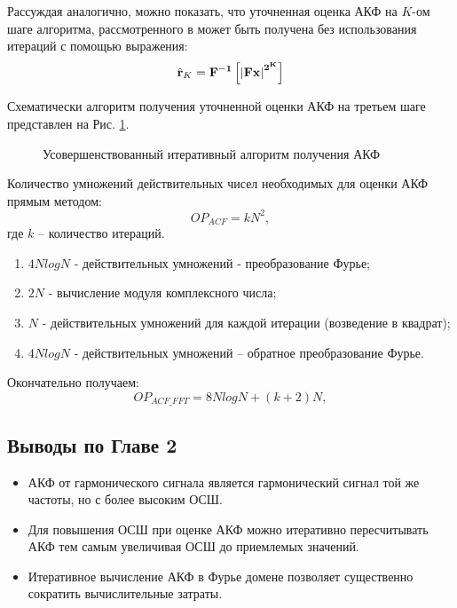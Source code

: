 Рассуждая аналогично, можно показать, что уточненная оценка АКФ на ${K}$-ом шаге алгоритма, рассмотренного в \cite{ostanin_akf}
может быть получена без использования итераций с помощью выражения:
\begin{equation}
	\label{eq:akf_3}
	\hat{\bf{r}}_K = \bf{F}^{-1}\left[ \left| \bf{Fx} \right| ^{2^K} \right]
\end{equation}

Схематически алгоритм получения уточненной оценки АКФ на третьем шаге представлен на Рис. \ref{pic:akf_pic}.

\begin{figure}[h]
	\center{}
	\caption{Усовершенствованный итеративный алгоритм получения АКФ}
	\label{pic:akf_pic}
\end{figure}

Количество умножений действительных чисел необходимых для оценки АКФ прямым методом: 
\begin{equation}
	\label{eq:num_of_op_acf}
	OP_{ACF}=kN^2,
\end{equation}
где ${k}$  – количество итераций.

\begin{enumerate}
\item ${4NlogN}$ - действительных умножений - преобразование Фурье;
\item ${2N}$ - вычисление модуля комплексного числа;
\item ${N}$ - действительных умножений для каждой итерации (возведение в квадрат);
\item ${4NlogN}$ - действительных умножений – обратное преобразование Фурье. 
\end{enumerate}

Окончательно получаем:
\begin{equation}
	\label{eq:num_of_op_acf}
	OP_{ACF\_FFT}=8NlogN + (k+2)N,
\end{equation}

\subsection{Выводы по Главе 2}

\begin{itemize}
\item АКФ от гармонического сигнала является гармонический сигнал той же частоты, но с более высоким ОСШ.
\item Для повышения ОСШ при оценке АКФ можно итеративно пересчитывать АКФ тем самым увеличивая ОСШ до приемлемых значений.
\item Итеративное вычисление АКФ в Фурье домене позволяет существенно сократить вычислительные затраты.
\end{itemize}


\clearpage
